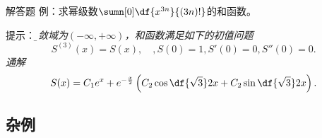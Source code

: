 % 	



% 	



\begin{frame}{解答题}
	\linespread{1.2}
	\alert{例：}求幂级数$\sumn[0]\df{x^{3n}}{(3n)!}$的和函数。
	
	\pause\alert{提示：}\it\b 
	收敛域为$(-\infty,+\infty)$，和函数满足如下的初值问题
	$$S^{(3)}(x)=S(x),\quad,S(0)=1,S'(0)=0,S''(0)=0.$$
	通解
	$$S(x)=C_1e^x+e^{-\frac x2}\left(C_2\cos\df{\sqrt3}2x
	+C_2\sin\df{\sqrt3}2x\right).$$
\end{frame}

% 	

\subsection{杂例}

